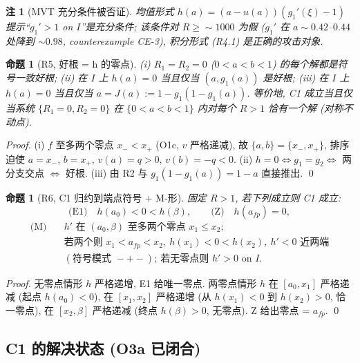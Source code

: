 \documentclass[UTF8]{ctexart}
\newtheorem{proposition}[theorem]{命题}
\newtheorem{remark}[theorem]{注}
\begin{document}
\begin{remark}[MVT 充分条件被否证]
均值形式 $h(a)=(a-u(a))(g_1'(\xi)-1)$ 提示``$g_1'>1$ on $I$''是充分条件;
该条件对 $R\ge\sim1000$ 为假 ($g_1'$ 在 $a\sim0.42$--$0.44$ 处降到 $\sim0.98$,
counterexample CE-3), 积分形式 (R4.1) 是正确的攻击对象.
\end{remark}

\begin{proposition}[R5, 好根 = h 的零点]
(i) $R_1=R_2=0$ ($0<a<b<1$) 的每个解都是符号一致好根;
(ii) 在 $I$ 上 $h(a)=0$ 当且仅当 $(a,g_1(a))$ 是好根;
(iii) 在 $I$ 上 $h(a)=0$ 当且仅当 $a=J(a):=1-g_1(1-g_1(a))$.
等价地, C1 成立当且仅当系统 $\{R_1=0,R_2=0\}$ 在 $\{0<a<b<1\}$ 内对每个 $R>1$
恰有一个解 (对称不动点).
\end{proposition}
\begin{proof}
(i) $f$ 至多两个零点 $x_-<x_+$ (O1c, $v$ 严格递减), 故 $\{a,b\}=\{x_-,x_+\}$,
排序迫使 $a=x_-$, $b=x_+$, $v(a)=q>0$, $v(b)=-q<0$.
(ii) $h=0\iff g_1=g_2\iff$ 两分支交点 $\iff$ 好根.
(iii) 由 R2 与 $g_1(1-g_1(a))=1-a$ 直接推出. \qed
\end{proof}

\begin{proposition}[R6, C1 归约到端点符号 + M-形]
固定 $R>1$, 若下列成立则 C1 成立:
\begin{equation}
	\text{(E1)}\quad h(a_0)<0<h(\beta),\qquad
	\text{(Z)}\quad h(a_{fp})=0,
\end{equation}
\begin{equation}
	\begin{split}
		\text{(M)}\quad & h' \text{ 在 } (a_0,\beta) \text{ 至多两个零点 } x_1\le x_2;\\
		& \text{若两个则 } x_1<a_{fp}<x_2,\ h(x_1)<0<h(x_2),\ h'<0 \text{ 近两端}\\
		& (\text{符号模式 } -+-);\ \text{若无零点则 } h'>0 \text{ on } I.
	\end{split}
\end{equation}
\end{proposition}
\begin{proof}
无零点情形 $h$ 严格递增, E1 给唯一零点. 两零点情形 $h$ 在
$[a_0,x_1]$ 严格递减 (起点 $h(a_0)<0$), 在 $[x_1,x_2]$ 严格递增
(从 $h(x_1)<0$ 到 $h(x_2)>0$, 恰一零点), 在 $[x_2,\beta]$ 严格递减
(终点 $h(\beta)>0$, 无零点). Z 给出零点 = $a_{fp}$. \qed
\end{proof}

\subsection{C1 的解决状态 (O3a 已闭合)}
\end{document}

